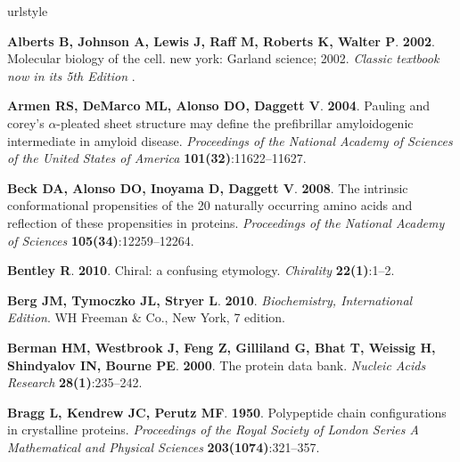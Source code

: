 \documentclass[fleqn,10pt,lineno]{wlpeerj} %
\begin{document}
%
\begin{thebibliography}{60}
\providecommand{\natexlab}[1]{#1}
\expandafter\ifx\csname urlstyle\endcsname\relax
  \providecommand{\doi}[1]{doi:\discretionary{}{}{}#1}\else
  \providecommand{\doi}{doi:\discretionary{}{}{}\begingroup
  \urlstyle{rm}\Url}\fi

\textbf{Alberts B, Johnson A, Lewis J, Raff M, Roberts K, Walter P}.
  \textbf{2002}.
\newblock Molecular biology of the cell. new york: Garland science; 2002.
\newblock \emph{Classic textbook now in its 5th Edition} .

\textbf{Armen RS, DeMarco ML, Alonso DO, Daggett V}. \textbf{2004}.
\newblock Pauling and corey's $\alpha$-pleated sheet structure may define the
  prefibrillar amyloidogenic intermediate in amyloid disease.
\newblock \emph{Proceedings of the National Academy of Sciences of the United
  States of America} \textbf{101(32)}:11622--11627.

\textbf{Beck DA, Alonso DO, Inoyama D, Daggett V}. \textbf{2008}.
\newblock The intrinsic conformational propensities of the 20 naturally
  occurring amino acids and reflection of these propensities in proteins.
\newblock \emph{Proceedings of the National Academy of Sciences}
  \textbf{105(34)}:12259--12264.

\textbf{Bentley R}. \textbf{2010}.
\newblock Chiral: a confusing etymology.
\newblock \emph{Chirality} \textbf{22(1)}:1--2.

\textbf{Berg JM, Tymoczko JL, Stryer L}. \textbf{2010}.
\newblock \emph{Biochemistry, International Edition}.
\newblock WH Freeman \& Co., New York, 7 edition.

\textbf{Berman HM, Westbrook J, Feng Z, Gilliland G, Bhat T, Weissig H,
  Shindyalov IN, Bourne PE}. \textbf{2000}.
\newblock The protein data bank.
\newblock \emph{Nucleic Acids Research} \textbf{28(1)}:235--242.

\textbf{Bragg L, Kendrew JC, Perutz MF}. \textbf{1950}.
\newblock Polypeptide chain configurations in crystalline proteins.
\newblock \emph{Proceedings of the Royal Society of London Series A
  Mathematical and Physical Sciences} \textbf{203(1074)}:321--357.


\end{thebibliography}
\end{document}
